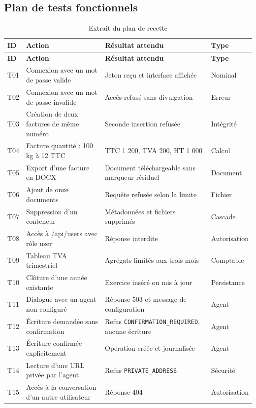 \documentclass[12pt,a4paper,oneside]{report}
\newcommand{\code}[1]{\texttt{#1}}
\begin{document}
\subsection{Plan de tests fonctionnels}
\begin{longtable}{p{1.5cm}p{5.3cm}p{5.4cm}p{2cm}}
\caption{Extrait du plan de recette}\label{tab:tests}\\
\toprule \textbf{ID} & \textbf{Action} & \textbf{Résultat attendu} & \textbf{Type}\\ \midrule
\endfirsthead
\toprule \textbf{ID} & \textbf{Action} & \textbf{Résultat attendu} & \textbf{Type}\\ \midrule
\endhead
T01 & Connexion avec un mot de passe valide & Jeton reçu et interface affichée & Nominal\\
T02 & Connexion avec un mot de passe invalide & Accès refusé sans divulgation & Erreur\\
T03 & Création de deux factures de même numéro & Seconde insertion refusée & Intégrité\\
T04 & Facture quantité : 100 kg à 12 TTC & TTC 1 200, TVA 200, HT 1 000 & Calcul\\
T05 & Export d'une facture en DOCX & Document téléchargeable sans marqueur résiduel & Document\\
T06 & Ajout de onze documents & Requête refusée selon la limite & Fichier\\
T07 & Suppression d'un conteneur & Métadonnées et fichiers supprimés & Cascade\\
T08 & Accès à /api/users avec rôle user & Réponse interdite & Autorisation\\
T09 & Tableau TVA trimestriel & Agrégats limités aux trois mois & Comptable\\
T10 & Clôture d'une année existante & Exercice inséré ou mis à jour & Persistance\\
T11 & Dialogue avec un agent non configuré & Réponse 503 et message de configuration & Agent\\
T12 & Écriture demandée sans confirmation & Refus \code{\small CONFIRMATION\_REQUIRED}, aucune écriture & Agent\\
T13 & Écriture confirmée explicitement & Opération créée et journalisée & Agent\\
T14 & Lecture d'une URL privée par l'agent & Refus \code{PRIVATE\_ADDRESS} & Sécurité\\
T15 & Accès à la conversation d'un autre utilisateur & Réponse 404 & Autorisation\\
\bottomrule
\end{longtable}
\end{document}

